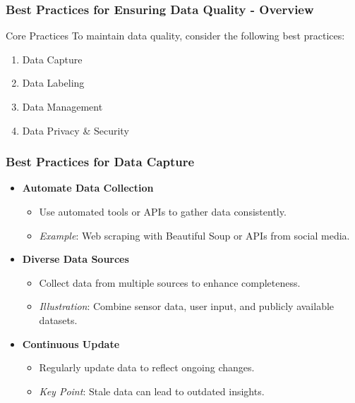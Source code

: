 \documentclass[aspectratio=169]{beamer}
\begin{document}
\begin{frame}[fragile]
    \frametitle{Best Practices for Ensuring Data Quality - Overview}
    \begin{block}{Core Practices}
        To maintain data quality, consider the following best practices:
        \begin{enumerate}
            \item Data Capture
            \item Data Labeling
            \item Data Management
            \item Data Privacy \& Security
        \end{enumerate}
    \end{block}
\end{frame}

\begin{frame}[fragile]
    \frametitle{Best Practices for Data Capture}
    \begin{itemize}
        \item \textbf{Automate Data Collection}
            \begin{itemize}
                \item Use automated tools or APIs to gather data consistently.
                \item \textit{Example}: Web scraping with Beautiful Soup or APIs from social media.
            \end{itemize}
        \item \textbf{Diverse Data Sources}
            \begin{itemize}
                \item Collect data from multiple sources to enhance completeness.
                \item \textit{Illustration}: Combine sensor data, user input, and publicly available datasets.
            \end{itemize}
        \item \textbf{Continuous Update}
            \begin{itemize}
                \item Regularly update data to reflect ongoing changes.
                \item \textit{Key Point}: Stale data can lead to outdated insights.
            \end{itemize}
    \end{itemize}
\end{frame}
\end{document}
